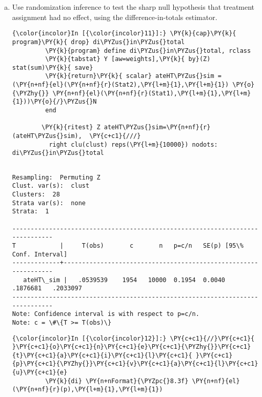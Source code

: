 \documentclass[11pt,notitlepage]{article}\usepackage[]{graphicx}\usepackage[]{color}
\makeatletter
\newenvironment{kframe}{%
 \def\at@end@of@kframe{}%
 \ifinner\ifhmode%
  \def\at@end@of@kframe{\end{minipage}}%
  \begin{minipage}{\columnwidth}%
 \fi\fi%
 \def\FrameCommand##1{\hskip\@totalleftmargin \hskip-\fboxsep
 \colorbox{shadecolor}{##1}\hskip-\fboxsep
     \hskip-\linewidth \hskip-\@totalleftmargin \hskip\columnwidth}%
 \MakeFramed {\advance\hsize-\width
   \@totalleftmargin\z@ \linewidth\hsize
   \@setminipage}}%
 {\par\unskip\endMakeFramed%
 \at@end@of@kframe}
\newenvironment{knitrout}{}{} %
\makeatother
\begin{document}
\begin{enumerate}[a)]
\item Use randomization inference to test the sharp null hypothesis that treatment assignment had no effect, using the difference-in-totals estimator.  

\begin{knitrout}
\color{fgcolor}\begin{kframe}
    \begin{Verbatim}[commandchars=\\\{\}]
{\color{incolor}In [{\color{incolor}11}]:} \PY{k}{cap}\PY{k}{ program}\PY{k}{ drop} di\PYZus{}in\PYZus{}total
         \PY{k}{program} define di\PYZus{}in\PYZus{}total, rclass
         \PY{k}{tabstat} Y [aw=weights],\PY{k}{ by}(Z)  stat(sum)\PY{k}{ save}
         \PY{k}{return}\PY{k}{ scalar} ateHT\PYZus{}sim = (\PY{n+nf}{el}(\PY{n+nf}{r}(Stat2),\PY{l+m}{1},\PY{l+m}{1}) \PY{o}{\PYZhy{}} \PY{n+nf}{el}(\PY{n+nf}{r}(Stat1),\PY{l+m}{1},\PY{l+m}{1}))\PY{o}{/}\PYZus{}N
         end
         
        \PY{k}{ritest} Z ateHT\PYZus{}sim=\PY{n+nf}{r}(ateHT\PYZus{}sim),  \PY{c+c1}{///}
          right clu(clust) reps(\PY{l+m}{10000}) nodots: di\PYZus{}in\PYZus{}total
\end{Verbatim}

    \begin{Verbatim}[commandchars=\\\{\}]
    
Resampling:  Permuting Z
Clust. var(s):  clust
Clusters:  28
Strata var(s):  none
Strata:  1

------------------------------------------------------------------------------
T            |     T(obs)       c       n   p=c/n   SE(p) [95\% Conf. Interval]
-------------+----------------------------------------------------------------
   ateHT\_sim |   .0539539    1954   10000  0.1954  0.0040  .1876681   .2033097
------------------------------------------------------------------------------
Note: Confidence interval is with respect to p=c/n.
Note: c = \#\{T >= T(obs)\}

    \end{Verbatim}

    \begin{Verbatim}[commandchars=\\\{\}]
{\color{incolor}In [{\color{incolor}12}]:} \PY{c+c1}{//}\PY{c+c1}{ }\PY{c+c1}{o}\PY{c+c1}{n}\PY{c+c1}{e}\PY{c+c1}{\PYZhy{}}\PY{c+c1}{t}\PY{c+c1}{a}\PY{c+c1}{i}\PY{c+c1}{l}\PY{c+c1}{ }\PY{c+c1}{p}\PY{c+c1}{\PYZhy{}}\PY{c+c1}{v}\PY{c+c1}{a}\PY{c+c1}{l}\PY{c+c1}{u}\PY{c+c1}{e}
         \PY{k}{di} \PY{n+nFormat}{\PYZpc{}8.3f} \PY{n+nf}{el}(\PY{n+nf}{r}(p),\PY{l+m}{1},\PY{l+m}{1})
\end{Verbatim}


\end{kframe}
\end{knitrout}
\end{enumerate}
\end{document}
